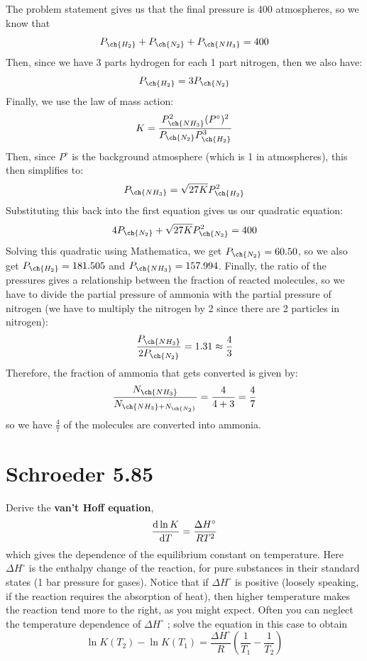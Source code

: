 \documentclass[10pt]{article}
\begin{document}
	\begin{solution}
		The problem statement gives us that the final pressure is 400 atmospheres, so we know that 
		\[
			P_{\ch{H_2}} + P_{\ch{N_2}} + P_{\ch{NH_3}} = 400
		\] 
		Then, since we have 3 parts hydrogen for each 1 part nitrogen, then we also have:
		\[
			P_{\ch{H_2}} = 3P_{\ch{N_2}}
		\] 
		Finally, we use the law of mass action:
		\[
			K = \frac{P_{\ch{NH_3}}^2 (P^\circ)^2}{P_{\ch{N_2}} P_{\ch{H_2}}^3}
		\] 
		Then, since \( P^\circ \) is the background atmosphere (which is 1 in atmospheres), this then 
		simplifies to:
		\[
			P_{\ch{NH_3}} = \sqrt{27K} P_{\ch{H_2}}^2
		\] 
		Substituting this back into the first equation gives us our quadratic equation:
		\[
			4P_{\ch{N_2}} + \sqrt{27K} P_{\ch{N_2}}^2 = 400
		\] 
		Solving this quadratic using Mathematica, we get \( P_{\ch{N_2}} = 60.50 \), so we also 
		get \( P_{\ch{H_2}} = 181.505 \) and \( P_{\ch{NH_3}} = 157.994\). Finally, the ratio of the pressures
		gives a relationship between the fraction of reacted molecules, so we have to divide the partial pressure
		of ammonia with the partial pressure of nitrogen (we have to multiply the nitrogen by 2 since there are 
		2 particles in nitrogen):
		\[
			\frac{P_{\ch{NH_3}}}{2P_{\ch{N_2}}} = 1.31 \approx \frac{4}{3}
		\] 
		Therefore, the fraction of ammonia that gets converted is given by:
		\[
			\frac{N_{\ch{NH_3}}}{N_{\ch{NH_3} + N_{\ch{N_2}}}} = \frac{4}{4+3} = \frac{4}{7}
		\] 
		so we have \( \frac{4}{7} \) of the molecules are converted into ammonia.   
	\end{solution}
	\pagebreak
	\section*{Schroeder 5.85}
	Derive the \textbf{van't Hoff equation}, 
	\[
		\dv{\ln K}{T} = \frac{\Delta H^\circ}{RT^2}
	\] 
	which gives the dependence of the equilibrium constant on temperature. Here \(\Delta H^\circ\) is 
	the enthalpy change of the reaction, for pure substances in their standard states (1 bar pressure for 
	gases). Notice that if \(\Delta H^\circ\) is positive (loosely speaking, if the reaction requires the 
	absorption of heat), then higher temperature makes the reaction tend more to the right, as you 
	might expect. Often you can neglect the temperature dependence of \(\Delta H^\circ\) ; solve the equation 
	in this case to obtain
	\[
	\ln K(T_2) - \ln K(T_1) = \frac{\Delta H^\circ}{R}\left( \frac{1}{T_1} - \frac{1}{T_2} \right) 
	\] 
\end{document}

